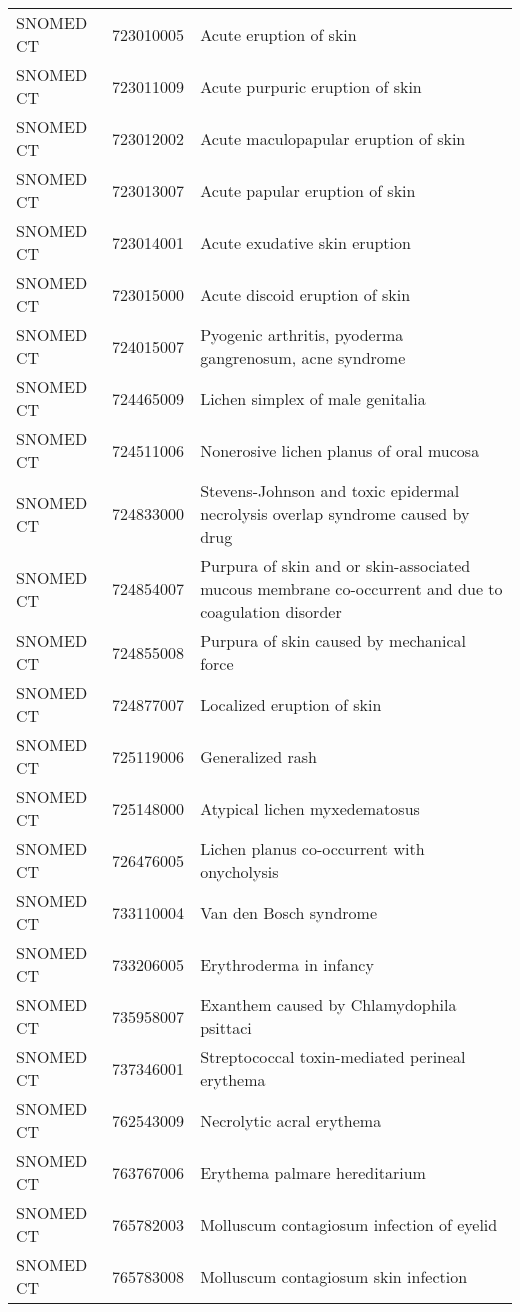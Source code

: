\begin{longtable}{p{}p{}p{}}
  SNOMED CT & 723010005 & Acute eruption of skin \\ 
  SNOMED CT & 723011009 & Acute purpuric eruption of skin \\ 
  SNOMED CT & 723012002 & Acute maculopapular eruption of skin \\ 
  SNOMED CT & 723013007 & Acute papular eruption of skin \\ 
  SNOMED CT & 723014001 & Acute exudative skin eruption \\ 
  SNOMED CT & 723015000 & Acute discoid eruption of skin \\ 
  SNOMED CT & 724015007 & Pyogenic arthritis, pyoderma gangrenosum, acne syndrome \\ 
  SNOMED CT & 724465009 & Lichen simplex of male genitalia \\ 
  SNOMED CT & 724511006 & Nonerosive lichen planus of oral mucosa \\ 
  SNOMED CT & 724833000 & Stevens-Johnson and toxic epidermal necrolysis overlap syndrome caused by drug \\ 
  SNOMED CT & 724854007 & Purpura of skin and or skin-associated mucous membrane co-occurrent and due to coagulation disorder \\ 
  SNOMED CT & 724855008 & Purpura of skin caused by mechanical force \\ 
  SNOMED CT & 724877007 & Localized eruption of skin \\ 
  SNOMED CT & 725119006 & Generalized rash \\ 
  SNOMED CT & 725148000 & Atypical lichen myxedematosus \\ 
  SNOMED CT & 726476005 & Lichen planus co-occurrent with onycholysis \\ 
  SNOMED CT & 733110004 & Van den Bosch syndrome \\ 
  SNOMED CT & 733206005 & Erythroderma in infancy \\ 
  SNOMED CT & 735958007 & Exanthem caused by Chlamydophila psittaci \\ 
  SNOMED CT & 737346001 & Streptococcal toxin-mediated perineal erythema \\ 
  SNOMED CT & 762543009 & Necrolytic acral erythema \\ 
  SNOMED CT & 763767006 & Erythema palmare hereditarium \\ 
  SNOMED CT & 765782003 & Molluscum contagiosum infection of eyelid \\ 
  SNOMED CT & 765783008 & Molluscum contagiosum skin infection \\ 

\end{longtable}
